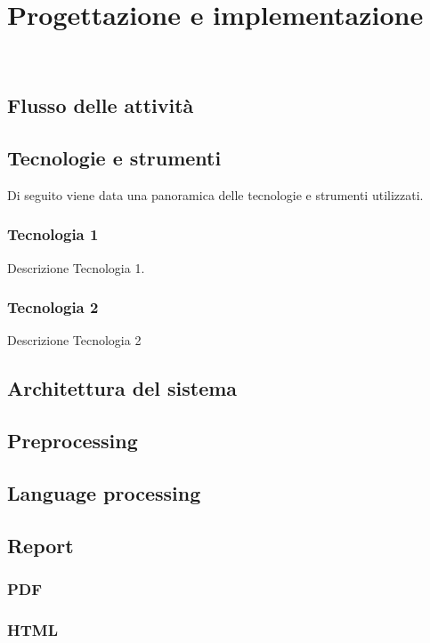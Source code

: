 \chapter{Progettazione e implementazione}
\label{cap:progettazione-implementazione}

\\

\section{Flusso delle attività}


\section{Tecnologie e strumenti}
\label{sec:tecnologie-strumenti}

Di seguito viene data una panoramica delle tecnologie e strumenti utilizzati.

\subsection{Tecnologia 1}
Descrizione Tecnologia 1.

\subsection{Tecnologia 2}
Descrizione Tecnologia 2


\section{Architettura del sistema}

\section{Preprocessing}

\section{Language processing}

\section{Report}
\subsection{PDF}
\subsection{HTML}

